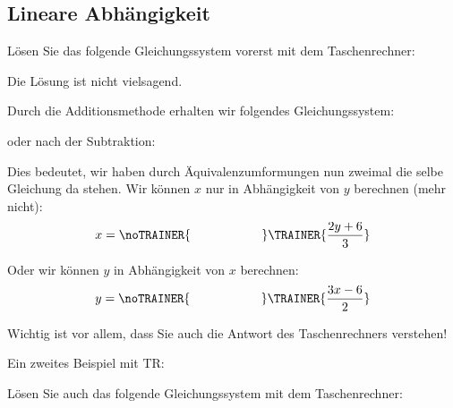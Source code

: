 \subsection{Lineare Abhängigkeit}

Lösen Sie das folgende Gleichungssystem vorerst mit dem
Taschenrechner:


Die Lösung ist nicht vielsagend.

Durch die Additionsmethode erhalten wir folgendes Gleichungssystem:


oder nach der Subtraktion:


Dies bedeutet, wir haben durch Äquivalenzumformungen nun zweimal die selbe
Gleichung da stehen. Wir können $x$ nur in Abhängigkeit von $y$
berechnen (mehr nicht):
$$x=\noTRAINER{\hspace{20mm}}\TRAINER{\frac{2y+6}{3}}$$

Oder wir können $y$ in Abhängigkeit von $x$ berechnen:
$$y=\noTRAINER{\hspace{20mm}}\TRAINER{\frac{3x-6}{2}}$$

Wichtig ist vor allem, dass Sie auch die Antwort des Taschenrechners verstehen!
\newpage

Ein zweites Beispiel mit TR:

Lösen Sie auch das folgende Gleichungssystem mit dem Taschenrechner:


\newpage
